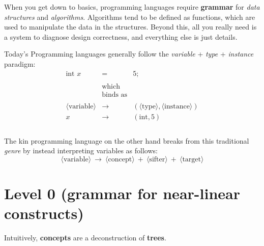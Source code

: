 \documentclass[twoside]{article}
\begin{document}
When you get down to basics, programming languages require {\bf grammar} for \emph{data structures} and \emph{algorithms}.
Algorithms tend to be defined as functions, which are used to manipulate the data in the structures. Beyond this,
all you really need is a system to diagnose design correctness, and everything else is just details.

Today's Programming languages generally follow the \emph{variable} + \emph{type} + \emph{instance} paradigm:
$$ \begin{array}{rcl}
\mbox{int } x			& =			& 5;									\\
																\\
				& \mbox{which}		&									\\
				& \mbox{binds as}	&									\\
																\\
\langle\mbox{variable}\rangle	& \to			& (\langle\mbox{type}\rangle, \langle\mbox{instance}\rangle)		\\
x				& \to			& (\mbox{int}, 5)							\\
																\\
\end{array} $$

The kin programming language on the other hand breaks from this
traditional \emph{genre} by instead interpreting variables as follows:
$$ \langle\mbox{variable}\rangle\ \to\ \langle\mbox{concept}\rangle\ +\ \langle\mbox{sifter}\rangle\ +\ \langle\mbox{target}\rangle $$

\section*{Level 0 {\normalfont (grammar for near-linear constructs)}}

Intuitively, {\bf concepts} are a deconstruction of {\bf trees}.\\[0.1cm]
\end{document}
